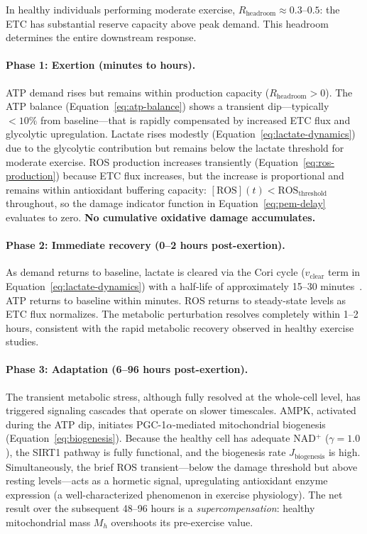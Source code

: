 In healthy individuals performing moderate exercise, $R_{\text{headroom}} \approx 0.3$--$0.5$: the ETC has substantial reserve capacity above peak demand. This headroom determines the entire downstream response.

\paragraph{Phase 1: Exertion (minutes to hours).}
ATP demand rises but remains within production capacity ($R_{\text{headroom}} > 0$). The ATP balance (Equation~\ref{eq:atp-balance}) shows a transient dip---typically $<10\%$ from baseline---that is rapidly compensated by increased ETC flux and glycolytic upregulation. Lactate rises modestly (Equation~\ref{eq:lactate-dynamics}) due to the glycolytic contribution but remains below the lactate threshold for moderate exercise. ROS production increases transiently (Equation~\ref{eq:ros-production}) because ETC flux increases, but the increase is proportional and remains within antioxidant buffering capacity: $[\text{ROS}](t) < \text{ROS}_{\text{threshold}}$ throughout, so the damage indicator function in Equation~\ref{eq:pem-delay} evaluates to zero. \textbf{No cumulative oxidative damage accumulates.}

\paragraph{Phase 2: Immediate recovery (0--2 hours post-exertion).}
As demand returns to baseline, lactate is cleared via the Cori cycle ($v_{\text{clear}}$ term in Equation~\ref{eq:lactate-dynamics}) with a half-life of approximately 15--30 minutes~\cite{Brooks2018lactate}. ATP returns to baseline within minutes. ROS returns to steady-state levels as ETC flux normalizes. The metabolic perturbation resolves completely within 1--2 hours, consistent with the rapid metabolic recovery observed in healthy exercise studies.

\paragraph{Phase 3: Adaptation (6--96 hours post-exertion).}
The transient metabolic stress, although fully resolved at the whole-cell level, has triggered signaling cascades that operate on slower timescales. AMPK, activated during the ATP dip, initiates PGC-1$\alpha$-mediated mitochondrial biogenesis (Equation~\ref{eq:biogenesis}). Because the healthy cell has adequate NAD$^+$ ($\gamma = 1.0$), the SIRT1 pathway is fully functional, and the biogenesis rate $J_{\text{biogenesis}}$ is high. Simultaneously, the brief ROS transient---below the damage threshold but above resting levels---acts as a hormetic signal, upregulating antioxidant enzyme expression (a well-characterized phenomenon in exercise physiology). The net result over the subsequent 48--96 hours is a \emph{supercompensation}: healthy mitochondrial mass $M_h$ overshoots its pre-exercise value.

